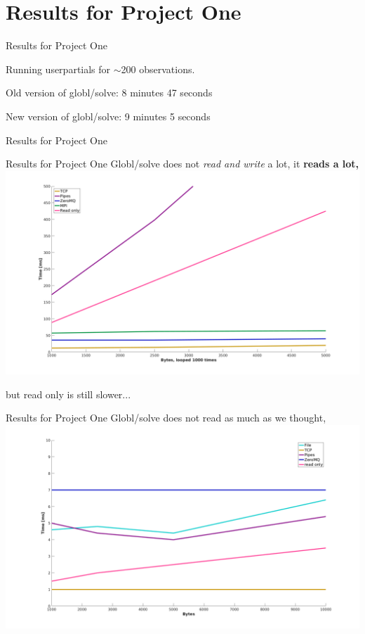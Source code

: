 \documentclass{beamer}
\begin{document}

    \section{Results for Project One}

    \begin{frame}{Results for Project One}
        \begin{description}[<+-|alert@+>]
            \item Running userpartials for $\sim$200 observations.
            \item Old version of globl/solve: 8 minutes 47 seconds
            \item New version of globl/solve: 9 minutes 5 seconds
        \end{description}
    \end{frame}
    \begin{frame}{Results for Project One}
    \end{frame}
    \begin{frame}{Results for Project One}
        Globl/solve does not \emph{read and write} a lot, it \bf{reads} a lot,
        \centering
        \includegraphics[width=1\columnwidth]{thousandrun}

        but read only is still slower...
    \end{frame}
    \begin{frame}{Results for Project One}
        Globl/solve does not read as much as we thought,
        \centering
        \includegraphics[width=1\columnwidth]{singlerun}
    \end{frame}
\end{document}

